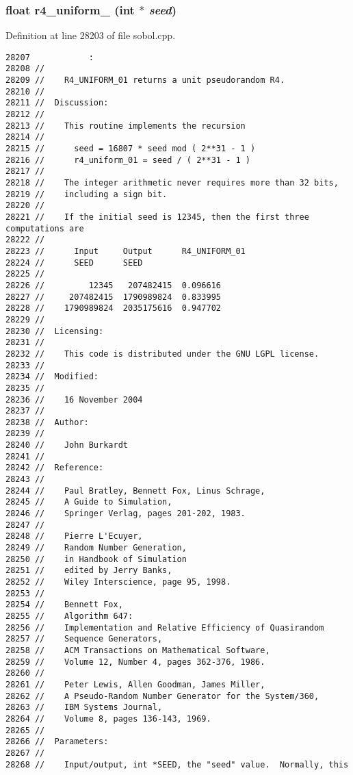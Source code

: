 \subsubsection{\setlength{\rightskip}{0pt plus 5cm}float r4\_\-uniform\_ (int $\ast$ {\em seed})}\label{test_2sobol_8H_c7a3edc3054464fd79ad79a022b701e8}




Definition at line 28203 of file sobol.cpp.

\begin{Code}\begin{verbatim}28207            :
28208 //
28209 //    R4_UNIFORM_01 returns a unit pseudorandom R4.
28210 //
28211 //  Discussion:
28212 //
28213 //    This routine implements the recursion
28214 //
28215 //      seed = 16807 * seed mod ( 2**31 - 1 )
28216 //      r4_uniform_01 = seed / ( 2**31 - 1 )
28217 //
28218 //    The integer arithmetic never requires more than 32 bits,
28219 //    including a sign bit.
28220 //
28221 //    If the initial seed is 12345, then the first three computations are
28222 //
28223 //      Input     Output      R4_UNIFORM_01
28224 //      SEED      SEED
28225 //
28226 //         12345   207482415  0.096616
28227 //     207482415  1790989824  0.833995
28228 //    1790989824  2035175616  0.947702
28229 //
28230 //  Licensing:
28231 //
28232 //    This code is distributed under the GNU LGPL license. 
28233 //
28234 //  Modified:
28235 //
28236 //    16 November 2004
28237 //
28238 //  Author:
28239 //
28240 //    John Burkardt
28241 //
28242 //  Reference:
28243 //
28244 //    Paul Bratley, Bennett Fox, Linus Schrage,
28245 //    A Guide to Simulation,
28246 //    Springer Verlag, pages 201-202, 1983.
28247 //
28248 //    Pierre L'Ecuyer,
28249 //    Random Number Generation,
28250 //    in Handbook of Simulation
28251 //    edited by Jerry Banks,
28252 //    Wiley Interscience, page 95, 1998.
28253 //
28254 //    Bennett Fox,
28255 //    Algorithm 647:
28256 //    Implementation and Relative Efficiency of Quasirandom
28257 //    Sequence Generators,
28258 //    ACM Transactions on Mathematical Software,
28259 //    Volume 12, Number 4, pages 362-376, 1986.
28260 //
28261 //    Peter Lewis, Allen Goodman, James Miller,
28262 //    A Pseudo-Random Number Generator for the System/360,
28263 //    IBM Systems Journal,
28264 //    Volume 8, pages 136-143, 1969.
28265 //
28266 //  Parameters:
28267 //
28268 //    Input/output, int *SEED, the "seed" value.  Normally, this

\end{verbatim}
\end{Code}
